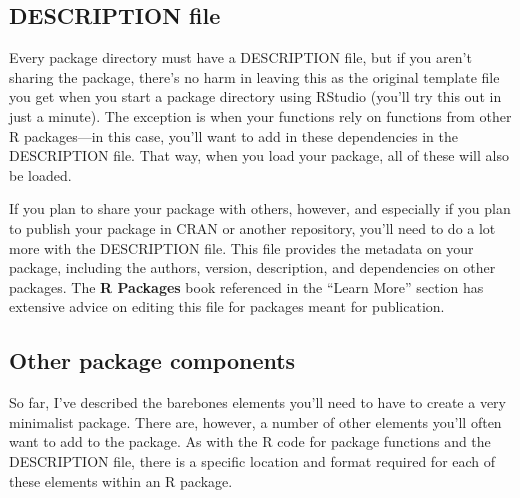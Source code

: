 \documentclass[]{tufte-book}
\begin{document}
\hypertarget{description-file}{%
\subsection{DESCRIPTION file}\label{description-file}}

Every package directory must have a DESCRIPTION file, but if you aren't sharing
the package, there's no harm in leaving this as the original template file you
get when you start a package directory using RStudio (you'll try this out in
just a minute). The exception is when your functions rely on functions from
other R packages---in this case, you'll want to add in these dependencies in the
DESCRIPTION file. That way, when you load your package, all of these will also
be loaded.

If you plan to share your package with others, however, and especially if you
plan to publish your package in CRAN or another repository, you'll need to do
a lot more with the DESCRIPTION file. This file provides the metadata on your package,
including the authors, version, description, and dependencies on other packages.
The \textbf{R Packages} book referenced in the ``Learn More'' section has extensive advice
on editing this file for packages meant for publication.

\hypertarget{other-package-components}{%
\subsection{Other package components}\label{other-package-components}}

So far, I've described the barebones elements you'll need to have to create a very
minimalist package. There are, however, a number of other elements you'll often
want to add to the package. As with the R code for package functions and the
DESCRIPTION file, there is a specific location and format required for each of
these elements within an R package.
\end{document}
